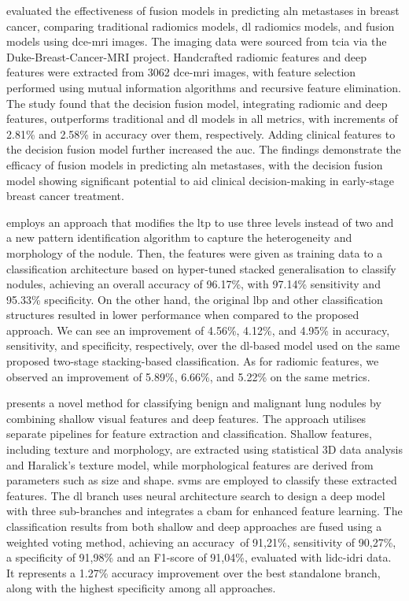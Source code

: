 \textcite{li_comparison_2022} evaluated the effectiveness of fusion models in predicting \ac{aln} metastases in breast cancer, comparing traditional radiomics models, \ac{dl} radiomics models, and fusion models using \ac{dce-mri} images. The imaging data were sourced from \ac{tcia} via the Duke-Breast-Cancer-MRI project. Handcrafted radiomic features and deep features were extracted from 3062 \ac{dce-mri} images, with feature selection performed using mutual information algorithms and recursive feature elimination. The study found that the decision fusion model, integrating radiomic and deep features, outperforms traditional and \ac{dl} models in all metrics, with increments of 2.81\% and 2.58\% in accuracy over them, respectively.
Adding clinical features to the decision fusion model further increased the \ac{auc}. The findings demonstrate the efficacy of fusion models in predicting \ac{aln} metastases, with the decision fusion model showing significant potential to aid clinical decision-making in early-stage breast cancer treatment.


\textcite{alksas_novel_2023} employs an approach that modifies the \ac{ltp} to use three levels instead of two and a new pattern identification algorithm to capture the heterogeneity and morphology of the nodule. Then, the features were given as training data to a classification architecture based on hyper-tuned stacked generalisation to classify nodules, achieving an overall accuracy of 96.17\%, with 97.14\% sensitivity and 95.33\% specificity. On the other hand, the original \ac{lbp} and other classification structures resulted in lower performance when compared to the proposed approach.
We can see an improvement of 4.56\%, 4.12\%, and 4.95\% in accuracy, sensitivity, and specificity, respectively, over the \ac{dl}-based model used on the same proposed two-stage stacking-based classification. As for radiomic features, we observed an improvement of 5.89\%, 6.66\%, and 5.22\% on the same metrics.

\textcite{liu_classification_2023} presents a novel method for classifying benign and malignant lung nodules by combining shallow visual features and deep features. The approach utilises separate pipelines for feature extraction and classification. Shallow features, including texture and morphology, are extracted using statistical 3D data analysis and Haralick's texture model, while morphological features are derived from parameters such as size and shape. \acp{svm} are employed to classify these extracted features. The \ac{dl} branch uses neural architecture search to design a deep model with three sub-branches and integrates a \ac{cbam} for enhanced feature learning. The classification results from both shallow and deep approaches are fused using a weighted voting method, achieving an accuracy\ of 91,21\%, sensitivity of 90,27\%, a specificity of 91,98\% and an F1-score of 91,04\%, evaluated with \ac{lidc-idri} data. It represents a 1.27\% accuracy improvement over the best standalone branch, along with the highest specificity among all approaches. 


